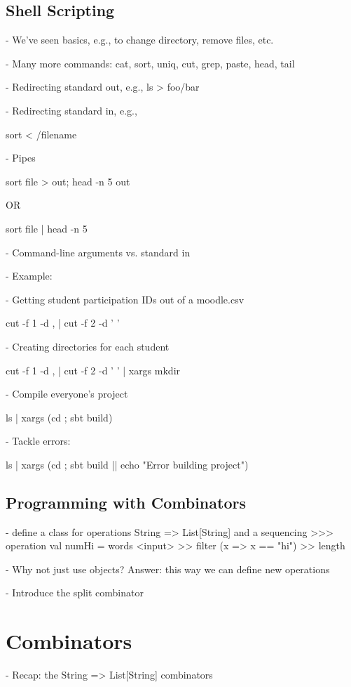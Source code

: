 \documentclass[9pt]{extbook}
\begin{document}
\section{Shell Scripting}

- We've seen basics, e.g., to change directory, remove files, etc.

- Many more commands: cat, sort, uniq, cut, grep, paste, head, tail

- Redirecting standard out, e.g., ls > foo/bar

- Redirecting standard in, e.g., 

  sort < /filename

- Pipes

  sort file > out; head -n 5 out 

   OR

  sort file | head -n 5


- Command-line arguments vs. standard in

- Example:

  - Getting student participation IDs out of a moodle.csv

    cut -f 1 -d , | cut -f 2 -d ' '

  - Creating directories for each student

    cut -f 1 -d , | cut -f 2 -d ' ' | xargs mkdir

  - Compile everyone's project

    ls | xargs (cd {}; sbt build)

  - Tackle errors:

    ls | xargs (cd {}; sbt build || echo "Error building project")

\section{Programming with Combinators}

- define a class for operations String => List[String] and a
  sequencing >>> operation
  val numHi = words <input> >> filter (x => x == "hi") >> length

- Why not just use objects? Answer: this way we can define new operations

- Introduce the split combinator

\chapter{Combinators}

- Recap: the String => List[String] combinators
\end{document}
